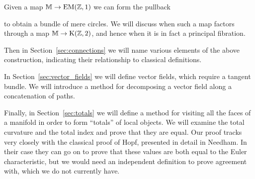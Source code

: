 Given a map \( \mathbb{M}\to\mathrm{EM}(\mathbb{Z},1) \) we can form the pullback
\begin{center}
\end{center}
to obtain a bundle of mere circles. We will discuss when such a map factors through a map \( \mathbb{M}\to \mathrm{K}(\mathbb{Z},2) \), and hence when it is in fact a principal fibration.

Then in Section~\ref{sec:connections} we will name various elements of the above construction, indicating their relationship to classical definitions.

In Section~\ref{sec:vector_fields} we will define vector fields, which require a tangent bundle. We will introduce a method for decomposing a vector field along a concatenation of paths.

Finally, in Section~\ref{sec:totals} we will define a method for visiting all the faces of a manifold in order to form ``totals'' of local objects. We will examine the total curvature and the total index and prove that they are equal. Our proof tracks very closely with the classical proof of Hopf\cite{hopf}, presented in detail in Needham\cite{needham}. In their case they can go on to prove that these values are both equal to the Euler characteristic, but we would need an independent definition to prove agreement with, which we do not currently have.

